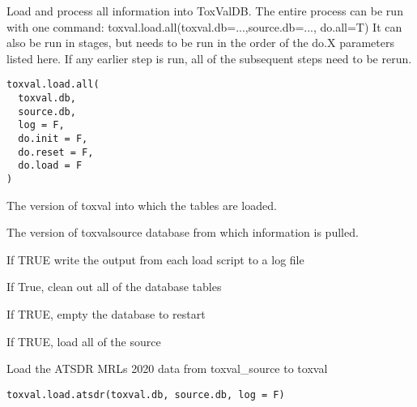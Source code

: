 \documentclass[letterpaper]{book}
\begin{document}
%
\begin{Description}\relax
Load and process all information into ToxValDB. The entire process can be run with
one command: toxval.load.all(toxval.db=...,source.db=..., do.all=T)
It can also be run in stages, but needs to be run in the order of the do.X parameters
listed here. If any earlier step is run, all of the subsequent steps need to be rerun.
\end{Description}
%
\begin{Usage}
\begin{verbatim}
toxval.load.all(
  toxval.db,
  source.db,
  log = F,
  do.init = F,
  do.reset = F,
  do.load = F
)
\end{verbatim}
\end{Usage}
%
\begin{Arguments}
\begin{ldescription}
\item[\code{toxval.db}] The version of toxval into which the tables are loaded.

\item[\code{source.db}] The version of toxvalsource database from which information is pulled.

\item[\code{log}] If TRUE write the output from each load script to a log file

\item[\code{do.init}] If True, clean out all of the database tables

\item[\code{do.reset}] If TRUE, empty the database to restart

\item[\code{do.load}] If TRUE, load all of the source
\end{ldescription}
\end{Arguments}
%
\begin{Description}\relax
Load the ATSDR MRLs 2020 data from toxval\_source to toxval
\end{Description}
%
\begin{Usage}
\begin{verbatim}
toxval.load.atsdr(toxval.db, source.db, log = F)
\end{verbatim}
\end{Usage}
\end{document}
